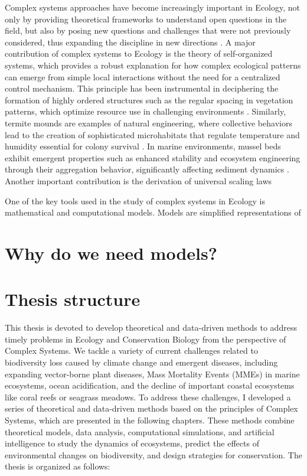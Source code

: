 Complex systems approaches have become increasingly important in Ecology, not
only by providing theoretical frameworks to understand open questions in the
field, but also by posing new questions and challenges that were not previously
considered, thus expanding the discipline in new directions \cite{Milne1998}. A
major contribution of complex systems to Ecology is the theory of
self-organized systems, which provides a robust explanation for how
complex ecological patterns can emerge from simple local interactions without
the need for a centralized control mechanism. This principle has been
instrumental in deciphering the formation of highly ordered structures such as
the regular spacing in vegetation patterns, which optimize resource use in
challenging environments \cite{Tarnita2017}. Similarly, termite mounds are
examples of natural engineering, where collective behaviors lead to the
creation of sophisticated microhabitats that regulate temperature and humidity
essential for colony survival \cite{Heyde2021}. In marine environments, mussel
beds exhibit emergent properties such as enhanced stability and ecosystem
engineering through their aggregation behavior, significantly affecting
sediment dynamics \cite{Koppel2008}. Another important contribution is the
derivation of universal scaling laws 

One of the key tools used in the study of complex systems in Ecology is
mathematical and computational models. Models are simplified representations of

\section{\label{sec:Why do we need models?} Why do we need models?}

\section{\label{sec:Thesis structure} Thesis structure}

This thesis is devoted to develop theoretical and data-driven methods to
address timely problems in Ecology and Conservation Biology from the
perspective of Complex Systems. We tackle a variety of current challenges
related to biodiversity loss caused by climate change and emergent diseases,
including expanding vector-borne plant diseases, Mass Mortality Events (MMEs)
in marine ecosystems, ocean acidification, and the decline of important coastal
ecosystems like coral reefs or seagrass meadows. To address these challenges, I
developed a series of theoretical and data-driven methods based on the
principles of Complex Systems, which are presented in the following chapters.
These methods combine theoretical models, data analysis, computational
simulations, and artificial intelligence to study the dynamics of ecosystems,
predict the effects of environmental changes on biodiversity, and design
strategies for conservation. The thesis is organized as follows: